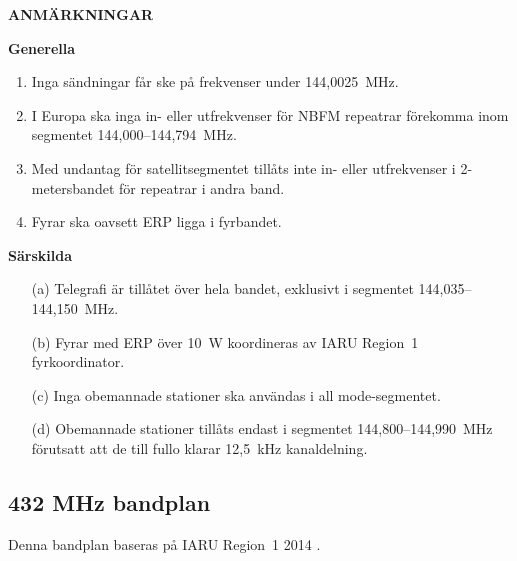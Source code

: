 \textbf{ANMÄRKNINGAR}

\textbf{Generella}
\begin{enumerate}[label=\alph*.]
\item Inga sändningar får ske på frekvenser under 144,0025~MHz.
\item I Europa ska inga in- eller utfrekvenser för NBFM repeatrar
  förekomma inom segmentet 144,000--144,794~MHz.
\item Med undantag för satellitsegmentet tillåts inte in- eller
  utfrekvenser i 2-metersbandet för repeatrar i andra band.
\item Fyrar ska oavsett ERP ligga i fyrbandet.
\end{enumerate}

\textbf{Särskilda}
\begin{itemize}
\item[(a)] Telegrafi är tillåtet över hela bandet, exklusivt i segmentet
  144,035--144,150~MHz.
\item[(b)] Fyrar med ERP över 10~W koordineras av IARU Region~1 fyrkoordinator.
\item[(c)] Inga obemannade stationer ska användas i all mode-segmentet.
\item[(d)] Obemannade stationer tillåts endast i segmentet 144,800--144,990~MHz
förutsatt att de till fullo klarar 12,5~kHz kanaldelning.
\end{itemize}

\subsection{432 MHz bandplan}
\label{432MHzbandplan}
Denna bandplan baseras på IARU Region~1 2014 \cite{IARU1}.

